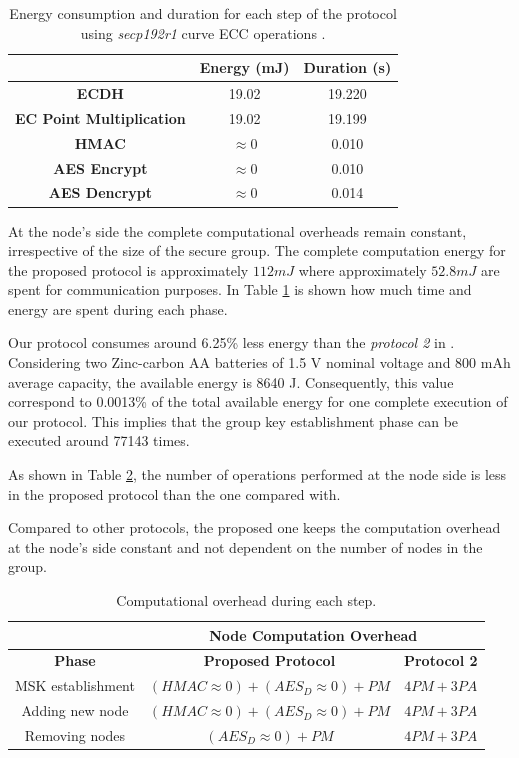 \begin{table}[H]
\caption{Energy consumption and duration for each step of the protocol using \textit{secp192r1} curve ECC operations .}
\label{energyTime}
\begin{center}
\begin{tabular}{|c|c|c|}
\hline
& \textbf{Energy (mJ)} &  \textbf{Duration (s)}\\
\hline
\textbf{ECDH} & 19.02 & 19.220\\
\hline
\textbf{EC Point Multiplication}& 19.02 & 19.199\\
\hline
\textbf{HMAC}& $\approx0$ & 0.010\\
\hline
\textbf{AES Encrypt}& $\approx0$ & 0.010\\
\hline
\textbf{AES Dencrypt}& $\approx0$ & 0.014\\
\hline
\end{tabular}
\end{center}
\end{table}

At the node's side the complete computational overheads remain constant, irrespective of the size of the secure group.
The complete computation energy for the proposed protocol is approximately $112 mJ$ where approximately $52.8 mJ$ are spent for communication purposes. 
In Table \ref{energyTime} is shown how much time and energy are spent during each phase. 

Our protocol consumes around 6.25\% less energy than the \textit{protocol 2} in \cite{Porambage2015}.
Considering two Zinc-carbon AA batteries of 1.5 V nominal voltage and 800 mAh average capacity, the available energy is 8640 J. Consequently, this value correspond to 0.0013\% of the total available energy for one complete execution of our protocol. 
This  implies that the group key establishment phase can be executed around 77143 times.

As shown in Table \ref{energyCons}, the number of operations performed at the node side is less in the proposed protocol than the one compared with.

Compared to other protocols, the proposed one keeps the computation overhead at the node's side constant and not dependent on the number of nodes in the group.
\begin{table}[h]
\caption{Computational overhead during each step.}
\label{energyCons}
\begin{center}
\begin{tabular}{|c|c|c|}
\hline
 & \multicolumn{2}{c|}{ \bf Node Computation Overhead}\\
\hline
\textbf{Phase} & \textbf{Proposed Protocol} & \textbf{Protocol 2 \cite{Porambage2015}}\\
\hline
 MSK establishment &  $(HMAC \approx 0) + (AES_{D}\approx0) + PM$ & $4PM + 3PA$\\ 
\hline
 Adding new node &  $(HMAC \approx 0) + (AES_{D}\approx0) + PM$ & $4PM + 3PA$\\
\hline
 Removing nodes &  $(AES_{D}\approx0) + PM$ & $4PM + 3PA$\\
\hline
\end{tabular}
\end{center}
\end{table}

